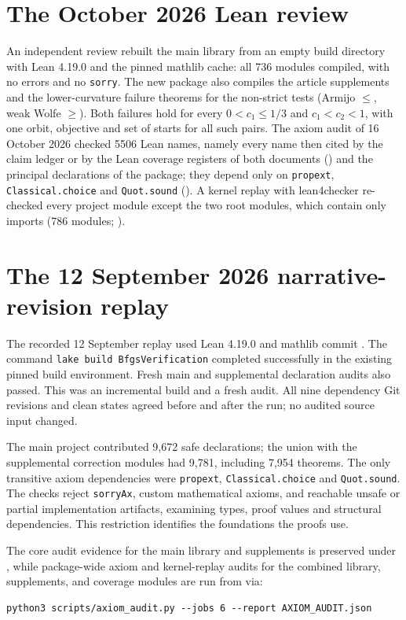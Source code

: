 \section*{The October 2026 Lean review}
An independent review rebuilt the main library from an empty build directory
with Lean 4.19.0 and the pinned mathlib cache: all 736 modules compiled, with
no errors and no \texttt{sorry}. The new package 
also compiles the article supplements and the lower-curvature failure theorems
for the non-strict tests (Armijo $\le$, weak Wolfe $\ge$). Both failures hold
for every $0<c_1\le1/3$ and $c_1<c_2<1$, with one orbit, objective and set of
starts for all such pairs. The axiom audit of 16 October 2026 checked 5506 Lean names, namely every name then cited by the claim ledger or by the Lean coverage registers of both documents
() and the principal declarations of the package; they depend only on \texttt{propext},
\texttt{Classical.choice} and \texttt{Quot.sound}
(). A kernel replay with lean4checker re-checked every project module except the two root modules, which contain only imports (786 modules; ).

\section*{The 12 September 2026 narrative-revision replay}
The recorded 12 September replay used Lean 4.19.0 and mathlib commit
.
The command \texttt{lake build BfgsVerification} completed successfully in
the existing pinned build environment. Fresh main and supplemental
declaration audits also passed. This was an incremental build and a fresh
audit.
All nine dependency Git revisions and clean states agreed before and after
the run; no audited source input changed.

The main project contributed 9,672 safe declarations; the union with the
supplemental correction modules had 9,781, including 7,954 theorems.
The only transitive axiom dependencies were \texttt{propext},
\texttt{Classical.choice} and \texttt{Quot.sound}. The checks reject
\texttt{sorryAx}, custom mathematical axioms, and reachable unsafe or partial
implementation artifacts, examining types, proof values and structural
dependencies. This restriction identifies the foundations the proofs use.

The core audit evidence for the main library and supplements is preserved under
, while package-wide axiom and
kernel-replay audits for the combined library, supplements, and coverage
modules are run from  via:
\begin{Verbatim}[fontsize=\small]
python3 scripts/axiom_audit.py --jobs 6 --report AXIOM_AUDIT.json
\end{Verbatim}


